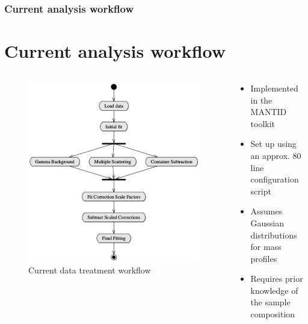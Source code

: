 \documentclass[10pt,serif,t]{beamer}
\newenvironment{Slide}[1]
{
\begin{frame}[fragile,environment=Slide]
  \frametitle{#1}
  \section{#1}
}
{
\end{frame}
}
\begin{document}
\begin{Slide}{Current analysis workflow}
  \begin{columns}[T]
    \begin{column}{.55\textwidth}
      \begin{figure}[h!]
        \centering
        \includegraphics[width=\textwidth]{graphics/current_workflow.eps}
        \caption{Current data treatment workflow \cite{ral_tr_2015_007}}
        \label{fig:current_workflow}
      \end{figure}
    \end{column}
    \hfill
    \begin{column}{.44\textwidth}
      \begin{itemize}
        \item Implemented in the MANTID \cite{mantid} toolkit
        \item Set up using an approx. 80 line configuration script
        \item Assumes Gaussian distributions for mass profiles
        \item Requires prior knowledge of the sample composition
      \end{itemize}
    \end{column}
  \end{columns}
\end{Slide}
\end{document}
